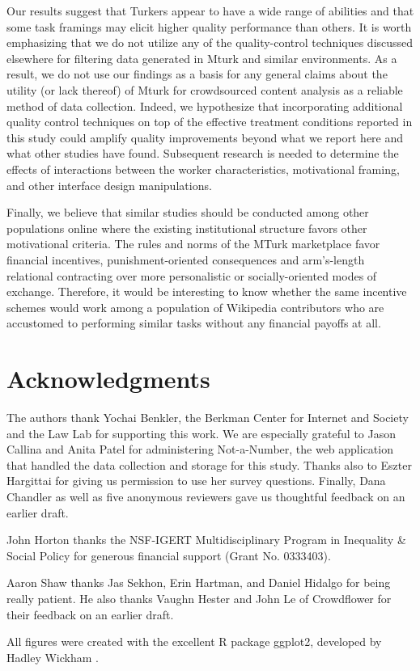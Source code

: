 \documentclass{cscw2010}
\begin{document}
Our results suggest that Turkers appear to have a wide range of
abilities and that some task framings may elicit higher quality
performance than others. It is worth emphasizing that we do not
utilize any of the quality-control techniques discussed elsewhere for
filtering data generated in Mturk and similar
environments\cite{von2004labeling, ipeirotis2010, snow2008cheap,
  Hopkins-King2010, downs2010your, chandler2010, kapelnerpreventing}.
As a result, we do not use our findings as a basis for any general
claims about the utility (or lack thereof) of Mturk for crowdsourced
content analysis as a reliable method of data collection. Indeed, we
hypothesize that incorporating additional quality control techniques
on top of the effective treatment conditions reported in this study
could amplify quality improvements beyond what we report here and what
other studies have found. Subsequent research is needed to determine
the effects of interactions between the worker characteristics,
motivational framing, and other interface design manipulations.

Finally, we believe that similar studies should be conducted among
other populations online where the existing institutional structure
favors other motivational criteria. The rules and norms of the MTurk
marketplace favor financial incentives, punishment-oriented
consequences and arm's-length relational contracting over more
personalistic or socially-oriented modes of exchange. Therefore, it
would be interesting to know whether the same incentive schemes would
work among a population of Wikipedia contributors who are accustomed
to performing similar tasks without any financial payoffs at all.

\section{Acknowledgments}

The authors thank Yochai Benkler, the Berkman Center for Internet and
Society and the Law Lab for supporting this work. We are especially
grateful to Jason Callina and Anita Patel for administering
Not-a-Number, the web application that handled the data collection and
storage for this study. Thanks also to Eszter Hargittai for giving us
permission to use her survey questions. Finally, Dana Chandler as well
as five anonymous reviewers gave us thoughtful feedback on an earlier
draft.

John Horton thanks the NSF-IGERT Multidisciplinary Program in
Inequality \& Social Policy for generous financial support (Grant
No. 0333403).

Aaron Shaw thanks Jas Sekhon, Erin Hartman, and Daniel Hidalgo for being really patient. He also thanks Vaughn Hester and John Le of Crowdflower for their feedback on an earlier draft.

All figures were created with the excellent R package ggplot2, developed by 
Hadley Wickham \cite{wickham2008ggplot2}.

\newpage




\end{document}

